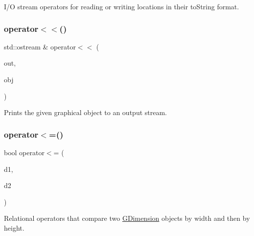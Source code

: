 I/O stream operators for reading or writing locations in their to\+String format. 

\mbox{\label{namespacesgl_aa74cdbd895203d2d9ee3cd26fb46feb0}} 
\subsubsection{\texorpdfstring{operator$<$$<$()}{operator<<()}\hspace{0.1cm}{\footnotesize\ttfamily [6/6]}}
{\footnotesize\ttfamily std\+::ostream \& operator$<$$<$ (\begin{DoxyParamCaption}\item[{std\+::ostream \&}]{out,  }\item[{const \mbox{\hyperlink{classsgl_1_1GObject}{G\+Object}} \&}]{obj }\end{DoxyParamCaption})}



Prints the given graphical object to an output stream. 

\mbox{\label{namespacesgl_af6f17bbe9041aee1572fc7be059bec62}} 
\subsubsection{\texorpdfstring{operator$<$=()}{operator<=()}\hspace{0.1cm}{\footnotesize\ttfamily [1/4]}}
{\footnotesize\ttfamily bool operator$<$= (\begin{DoxyParamCaption}\item[{const \mbox{\hyperlink{structsgl_1_1GDimension}{G\+Dimension}} \&}]{d1,  }\item[{const \mbox{\hyperlink{structsgl_1_1GDimension}{G\+Dimension}} \&}]{d2 }\end{DoxyParamCaption})}



Relational operators that compare two \mbox{\hyperlink{structsgl_1_1GDimension}{G\+Dimension}} objects by width and then by height. 

\mbox{\label{namespacesgl_a5b9606369659c394b2494828cb199b91}} 
